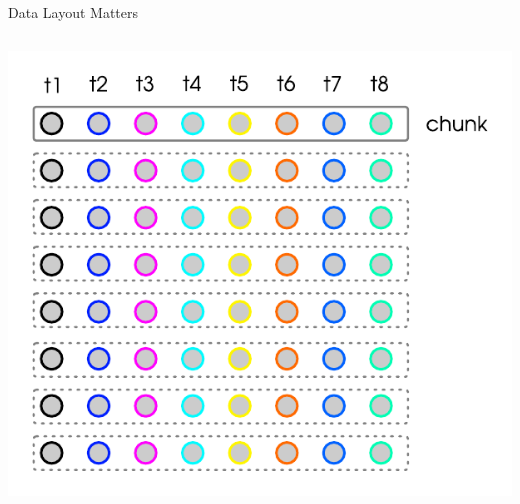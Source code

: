 \begin{frame}{Data Layout Matters}
\begin{columns}
{\begin{center}
          \includegraphics[height=0.65\paperheight]{graphics/grid_gpu}
        \end{center}
      }
  \end{columns}
\end{frame}

